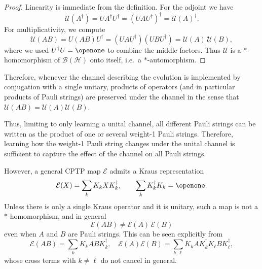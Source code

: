 \documentclass[%
 reprint,
 amsmath,amssymb,
 aps,
]{revtex4-2}
\begin{document}
\begin{proof}
Linearity is immediate from the definition. For the adjoint we have
\begin{equation}
  \mathcal{U}(A^{\dagger})
  = U A^{\dagger} U^{\dagger}
  = (UAU^{\dagger})^{\dagger}
  = \mathcal{U}(A)^{\dagger}.
\end{equation}
For multiplicativity, we compute
\begin{equation}
  \mathcal{U}(AB)
  = U (AB) U^{\dagger}
  = (UAU^{\dagger})(UBU^{\dagger})
  = \mathcal{U}(A)\,\mathcal{U}(B),
\end{equation}
where we used $U^{\dagger}U=\openone$ to combine the middle factors.
Thus $\mathcal{U}$ is a $*$-homomorphism of $\mathcal{B}(\mathcal{H})$
onto itself, i.e.\ a $*$-automorphism.
\end{proof}

Therefore, whenever the channel describing the evolution is implemented by conjugation with a single unitary, products of operators (and in particular products of Pauli strings) are preserved under the channel in the sense that $\mathcal{U}(AB)=\mathcal{U}(A)\mathcal{U}(B)$.

Thus, limiting to only learning a unital channel, all different Pauli strings can be written as the product of one or several weight-1 Pauli strings. Therefore, learning how the weight-1 Pauli string changes under the unital channel is sufficient to capture the effect of the channel on all Pauli strings.

However, a general CPTP map $\mathcal{E}$ admits a Kraus representation
\begin{equation}
  \mathcal{E}(X) = \sum_{k} K_k X K_k^{\dagger},
  \qquad \sum_{k} K_k^{\dagger}K_k = \openone.
\end{equation}
Unless there is only a single Kraus operator and it is unitary, such a map is not a $*$-homomorphism, and in general
\begin{equation}
  \mathcal{E}(AB) \neq \mathcal{E}(A)\,\mathcal{E}(B)
\end{equation}
even when $A$ and $B$ are Pauli strings.
This can be seen explicitly from
\begin{equation}
  \mathcal{E}(AB)
  = \sum_{k} K_k A B K_k^{\dagger},
  \quad
  \mathcal{E}(A)\mathcal{E}(B)
  = \sum_{k,\ell} K_k A K_k^{\dagger} K_{\ell} B K_{\ell}^{\dagger},
\end{equation}
whose cross terms with $k\neq \ell$ do not cancel in general.
\end{document}
